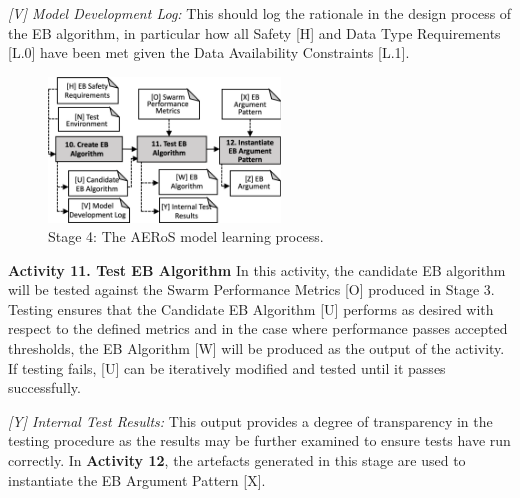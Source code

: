 \documentclass[runningheads]{llncs}
\begin{document}
\emph{[V] Model Development Log:} This should log the rationale in the design process of the EB algorithm, in particular how all Safety [H] and Data Type Requirements [L.0] have been met given the Data Availability Constraints [L.1].

\begin{figure}[!t]
	\centering
	\includegraphics[width=0.55\textwidth]{figures/AERoS-Stage4-V2.pdf}%
	\vspace{-2ex}
	\caption{Stage 4: The AERoS model learning process.}
	\label{amlas-a-stage4}
	\vspace{-4ex}
\end{figure}

\noindent\textbf{Activity 11. Test EB Algorithm} In this activity, the candidate EB algorithm will be tested against the Swarm Performance Metrics [O] produced in Stage 3. Testing ensures that the Candidate EB Algorithm [U] performs as desired with respect to the defined metrics and in the case where performance passes accepted thresholds, the EB Algorithm [W] will be produced as the output of the activity. If testing fails, [U] can be iteratively modified and tested until it passes successfully.

\emph{[Y] Internal Test Results:} This output provides a degree of transparency in the testing procedure as the results may be further examined to ensure tests have run correctly. 
In \textbf{Activity 12}, the artefacts generated in this stage are used to instantiate the EB Argument Pattern [X].
\end{document}
